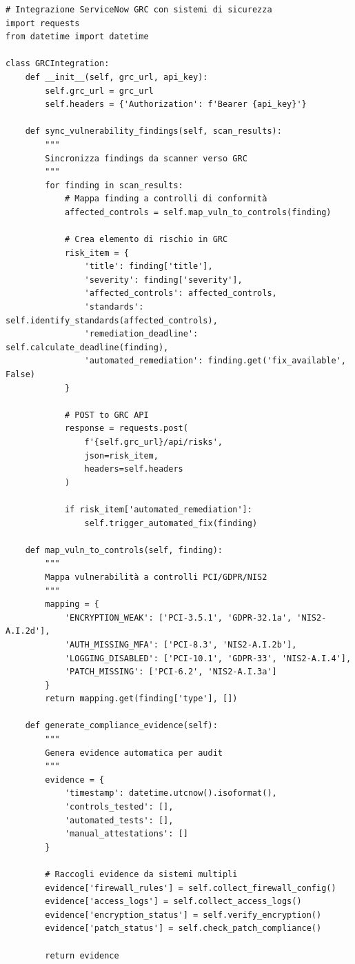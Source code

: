 \begin{lstlisting}[caption={Integrazione GRC via API},label={lst:grc_integration}]
# Integrazione ServiceNow GRC con sistemi di sicurezza
import requests
from datetime import datetime

class GRCIntegration:
    def __init__(self, grc_url, api_key):
        self.grc_url = grc_url
        self.headers = {'Authorization': f'Bearer {api_key}'}
    
    def sync_vulnerability_findings(self, scan_results):
        """
        Sincronizza findings da scanner verso GRC
        """
        for finding in scan_results:
            # Mappa finding a controlli di conformità
            affected_controls = self.map_vuln_to_controls(finding)
            
            # Crea elemento di rischio in GRC
            risk_item = {
                'title': finding['title'],
                'severity': finding['severity'],
                'affected_controls': affected_controls,
                'standards': self.identify_standards(affected_controls),
                'remediation_deadline': self.calculate_deadline(finding),
                'automated_remediation': finding.get('fix_available', False)
            }
            
            # POST to GRC API
            response = requests.post(
                f'{self.grc_url}/api/risks',
                json=risk_item,
                headers=self.headers
            )
            
            if risk_item['automated_remediation']:
                self.trigger_automated_fix(finding)
    
    def map_vuln_to_controls(self, finding):
        """
        Mappa vulnerabilità a controlli PCI/GDPR/NIS2
        """
        mapping = {
            'ENCRYPTION_WEAK': ['PCI-3.5.1', 'GDPR-32.1a', 'NIS2-A.I.2d'],
            'AUTH_MISSING_MFA': ['PCI-8.3', 'NIS2-A.I.2b'],
            'LOGGING_DISABLED': ['PCI-10.1', 'GDPR-33', 'NIS2-A.I.4'],
            'PATCH_MISSING': ['PCI-6.2', 'NIS2-A.I.3a']
        }
        return mapping.get(finding['type'], [])
    
    def generate_compliance_evidence(self):
        """
        Genera evidence automatica per audit
        """
        evidence = {
            'timestamp': datetime.utcnow().isoformat(),
            'controls_tested': [],
            'automated_tests': [],
            'manual_attestations': []
        }
        
        # Raccogli evidence da sistemi multipli
        evidence['firewall_rules'] = self.collect_firewall_config()
        evidence['access_logs'] = self.collect_access_logs()
        evidence['encryption_status'] = self.verify_encryption()
        evidence['patch_status'] = self.check_patch_compliance()
        
        return evidence
\end{lstlisting}

